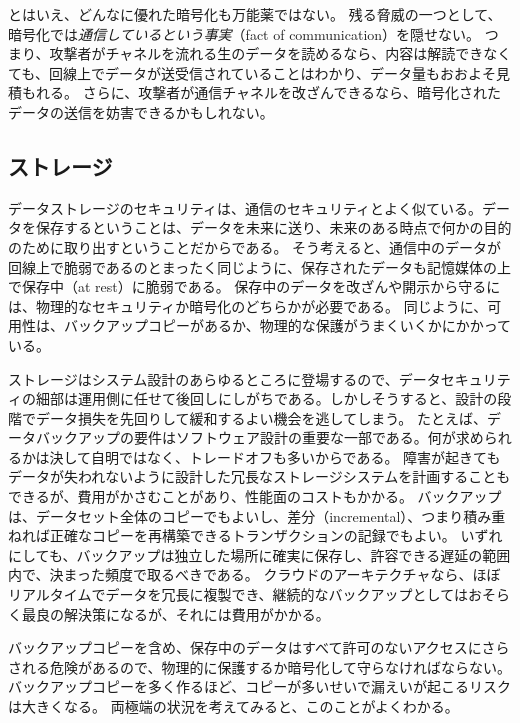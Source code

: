 \documentclass[uplatex]{jsarticle}
\def\label#1{}%
\begin{document}
\begin{rem}[暗号化は通信の事実を隠せない]\label{rem:ch3-fact-of-communication}
とはいえ、どんなに優れた暗号化も万能薬ではない。
残る脅威の一つとして、暗号化では\emph{通信しているという事実}（fact of communication）を隠せない。
つまり、攻撃者がチャネルを流れる生のデータを読めるなら、内容は解読できなくても、回線上でデータが送受信されていることはわかり、データ量もおおよそ見積もれる。
さらに、攻撃者が通信チャネルを改ざんできるなら、暗号化されたデータの送信を妨害できるかもしれない。
\end{rem}

\subsection{ストレージ}\label{subsec:ch3-storage}

データストレージのセキュリティは、通信のセキュリティとよく似ている。データを保存するということは、データを未来に送り、未来のある時点で何かの目的のために取り出すということだからである。
そう考えると、通信中のデータが回線上で脆弱であるのとまったく同じように、保存されたデータも記憶媒体の上で保存中（at rest）に脆弱である。
保存中のデータを改ざんや開示から守るには、物理的なセキュリティか暗号化のどちらかが必要である。
同じように、可用性は、バックアップコピーがあるか、物理的な保護がうまくいくかにかかっている。

ストレージはシステム設計のあらゆるところに登場するので、データセキュリティの細部は運用側に任せて後回しにしがちである。しかしそうすると、設計の段階でデータ損失を先回りして緩和するよい機会を逃してしまう。
たとえば、データバックアップの要件はソフトウェア設計の重要な一部である。何が求められるかは決して自明ではなく、トレードオフも多いからである。
障害が起きてもデータが失われないように設計した冗長なストレージシステムを計画することもできるが、費用がかさむことがあり、性能面のコストもかかる。
バックアップは、データセット全体のコピーでもよいし、差分（incremental）、つまり積み重ねれば正確なコピーを再構築できるトランザクションの記録でもよい。
いずれにしても、バックアップは独立した場所に確実に保存し、許容できる遅延の範囲内で、決まった頻度で取るべきである。
クラウドのアーキテクチャなら、ほぼリアルタイムでデータを冗長に複製でき、継続的なバックアップとしてはおそらく最良の解決策になるが、それには費用がかかる。

バックアップコピーを含め、保存中のデータはすべて許可のないアクセスにさらされる危険があるので、物理的に保護するか暗号化して守らなければならない。
バックアップコピーを多く作るほど、コピーが多いせいで漏えいが起こるリスクは大きくなる。
両極端の状況を考えてみると、このことがよくわかる。
\end{document}
